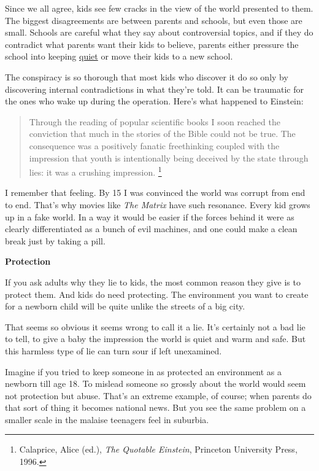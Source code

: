 Since we all agree, kids see few cracks in the view of the world
presented to them. The biggest disagreements are between parents and
schools, but even those are small. Schools are careful what they say
about controversial topics, and if they do contradict what parents want
their kids to believe, parents either pressure the school into keeping
\href{http://www.google.com/search?q=parents+complain+inappropriate+book}{quiet}
or move their kids to a new school.

The conspiracy is so thorough that most kids who discover it do so only
by discovering internal contradictions in what they're told. It can be
traumatic for the ones who wake up during the operation. Here's what
happened to Einstein:

\begin{quote}
Through the reading of popular scientific books I soon reached the
conviction that much in the stories of the Bible could not be true. The
consequence was a positively fanatic freethinking coupled with the
impression that youth is intentionally being deceived by the state
through lies: it was a crushing impression. \footnote{Calaprice, Alice (ed.), \emph{The Quotable Einstein}, Princeton
University Press, 1996.}
\end{quote}

I remember that feeling. By 15 I was convinced the world was corrupt
from end to end. That's why movies like \emph{The Matrix} have such
resonance. Every kid grows up in a fake world. In a way it would be
easier if the forces behind it were as clearly differentiated as a bunch
of evil machines, and one could make a clean break just by taking a
pill.

\textbf{Protection}

If you ask adults why they lie to kids, the most common reason they give
is to protect them. And kids do need protecting. The environment you
want to create for a newborn child will be quite unlike the streets of a
big city.

That seems so obvious it seems wrong to call it a lie. It's certainly
not a bad lie to tell, to give a baby the impression the world is quiet
and warm and safe. But this harmless type of lie can turn sour if left
unexamined.

Imagine if you tried to keep someone in as protected an environment as a
newborn till age 18. To mislead someone so grossly about the world would
seem not protection but abuse. That's an extreme example, of course;
when parents do that sort of thing it becomes national news. But you see
the same problem on a smaller scale in the malaise teenagers feel in
suburbia.

